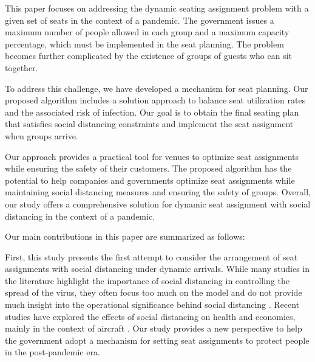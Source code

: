 


This paper focuses on addressing the dynamic seating assignment problem with a given set of seats in the context of a pandemic. The government issues a maximum number of people allowed in each group and a maximum capacity percentage, which must be implemented in the seat planning. The problem becomes further complicated by the existence of groups of guests who can sit together.

To address this challenge, we have developed a mechanism for seat planning. Our proposed algorithm includes a solution approach to balance seat utilization rates and the associated risk of infection. Our goal is to obtain the final seating plan that satisfies social distancing constraints and implement the seat assignment when groups arrive.

Our approach provides a practical tool for venues to optimize seat assignments while ensuring the safety of their customers. The proposed algorithm has the potential to help companies and governments optimize seat assignments while maintaining social distancing measures and ensuring the safety of groups. Overall, our study offers a comprehensive solution for dynamic seat assignment with social distancing in the context of a pandemic.


Our main contributions in this paper are summarized as follows:

First, this study presents the first attempt to consider the arrangement of seat assignments with social distancing under dynamic arrivals. While many studies in the literature highlight the importance of social distancing in controlling the spread of the virus, they often focus too much on the model and do not provide much insight into the operational significance behind social distancing \cite{barry2021optimal, fischetti2021safe}. Recent studies have explored the effects of social distancing on health and economics, mainly in the context of aircraft \cite{salari2020social, ghorbani2020model, salari2022social}. Our study provides a new perspective to help the government adopt a mechanism for setting seat assignments to protect people in the post-pandemic era.

